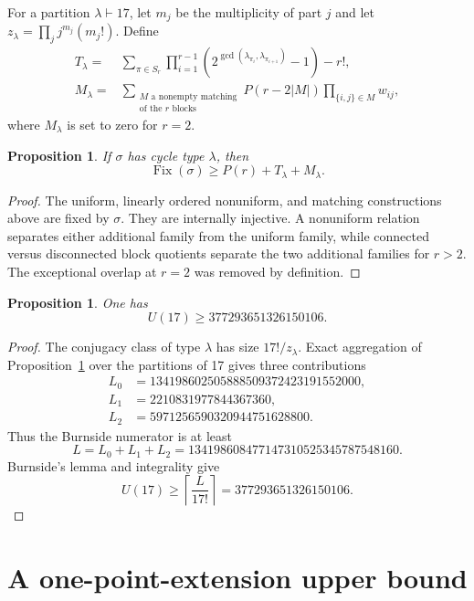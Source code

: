 \documentclass[11pt]{amsart}
\newtheorem{proposition}[theorem]{Proposition}
\theoremstyle{definition}
\newcommand{\Fix}{\operatorname{Fix}}
\begin{document}
For a partition $\lambda\vdash17$, let $m_j$ be the multiplicity of part $j$
and let $z_\lambda=\prod_j j^{m_j}(m_j!)$.  Define
\begin{align*}
T_\lambda={}&\sum_{\pi\in S_r}
\prod_{i=1}^{r-1}
\left(2^{\gcd(\lambda_{\pi_i},\lambda_{\pi_{i+1}})}-1\right)-r!,\\
M_\lambda={}&\sum_{\substack{M\text{ a nonempty matching}\\
                              \text{of the }r\text{ blocks}}}
P(r-2|M|)\prod_{\{i,j\}\in M}w_{ij},
\end{align*}
where $M_\lambda$ is set to zero for $r=2$.

\begin{proposition}\label{prop:fixedlower}
If $\sigma$ has cycle type $\lambda$, then
\[
\Fix(\sigma)\geq P(r)+T_\lambda+M_\lambda.
\]
\end{proposition}

\begin{proof}
The uniform, linearly ordered nonuniform, and matching constructions above
are fixed by $\sigma$.  They are internally injective.  A nonuniform relation
separates either additional family from the uniform family, while connected
versus disconnected block quotients separate the two additional families for
$r>2$.  The exceptional overlap at $r=2$ was removed by definition.
\end{proof}

\begin{proposition}\label{prop:lower}
One has
\[
U(17)\geq377293651326150106.
\]
\end{proposition}

\begin{proof}
The conjugacy class of type $\lambda$ has size $17!/z_\lambda$.  Exact
aggregation of Proposition~\ref{prop:fixedlower} over the partitions of 17
gives three contributions
\begin{align*}
L_0&=134198602505888509372423191552000,\\
L_1&=2210831977844367360,\\
L_2&=5971256590320944751628800.
\end{align*}
Thus the Burnside numerator is at least
\[
L=L_0+L_1+L_2=134198608477147310525345787548160.
\]
Burnside's lemma and integrality give
\[
U(17)\geq\left\lceil\frac{L}{17!}\right\rceil
=377293651326150106.
\]
\end{proof}

\section{A one-point-extension upper bound}
\end{document}
